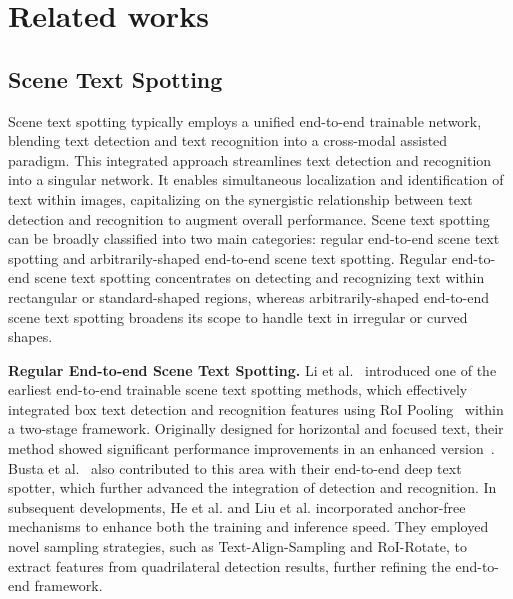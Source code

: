 \section{Related works}
\label{sec:rela}
   

    \subsection{Scene Text Spotting} 
    Scene text spotting typically employs a unified end-to-end trainable network, blending text detection and text recognition into a cross-modal assisted paradigm. This integrated approach streamlines text detection and recognition into a singular network. It enables simultaneous localization and identification of text within images, capitalizing on the synergistic relationship between text detection and recognition to augment overall performance. Scene text spotting can be broadly classified into two main categories: regular end-to-end scene text spotting and arbitrarily-shaped end-to-end scene text spotting. Regular end-to-end scene text spotting concentrates on detecting and recognizing text within rectangular or standard-shaped regions, whereas arbitrarily-shaped end-to-end scene text spotting broadens its scope to handle text in irregular or curved shapes.

    \noindent\textbf{Regular End-to-end Scene Text Spotting.}
    Li et al.~\cite{li2017towards} introduced one of the earliest end-to-end trainable scene text spotting methods, which effectively integrated box text detection and recognition features using RoI Pooling~\cite{ren2015faster} within a two-stage framework. Originally designed for horizontal and focused text, their method showed significant performance improvements in an enhanced version~\cite{li2019towards}. Busta et al.~\cite{busta2017deep} also contributed to this area with their end-to-end deep text spotter, which further advanced the integration of detection and recognition. In subsequent developments, He et al.\cite{he2018end} and Liu et al.\cite{liu2018fots} incorporated anchor-free mechanisms to enhance both the training and inference speed. They employed novel sampling strategies, such as Text-Align-Sampling and RoI-Rotate, to extract features from quadrilateral detection results, further refining the end-to-end framework.


